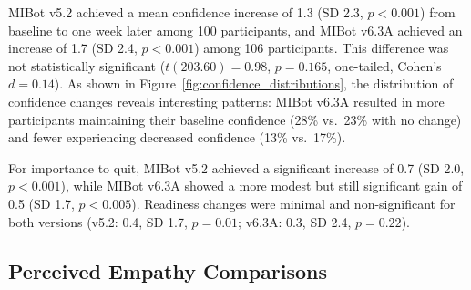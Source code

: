 MIBot v5.2 achieved a mean confidence increase of 1.3 (SD 2.3, $p<0.001$) 
from baseline to one week later among 100 participants, and 
MIBot v6.3A achieved an increase of 1.7 (SD 2.4, $p<0.001$) among 106 participants.  
This difference was not statistically significant ($t(203.60) = 0.98$, 
$p = 0.165$, one-tailed, Cohen's $d = 0.14$). As shown in Figure~\ref{fig:confidence_distributions}, 
the distribution of confidence changes reveals interesting patterns: MIBot v6.3A 
resulted in more participants maintaining their baseline confidence (28\% vs.\ 23\% 
with no change) and fewer experiencing decreased confidence (13\% vs.\ 17\%).

For importance to quit, MIBot v5.2 achieved a significant increase of 0.7 (SD 2.0, $p<0.001$), while MIBot v6.3A showed a more modest but still significant gain of 0.5 (SD 1.7, $p<0.005$). Readiness changes were minimal and non-significant for both versions (v5.2: 0.4, SD 1.7, $p=0.01$; v6.3A: 0.3, SD 2.4, $p=0.22$).

\subsection*{Perceived Empathy Comparisons}

